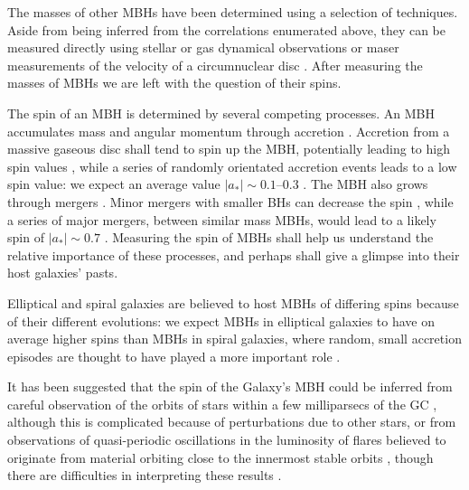 The masses of other MBHs have been determined using a selection of techniques. Aside from being inferred from the correlations enumerated above, they can be measured directly using stellar or gas dynamical observations \citep[e.g.,][]{Macchetto1997,vanderMarel1998,Gebhardt2003} or maser measurements of the velocity of a circumnuclear disc \citep[e.g.,][]{Miyoshi1995}. After measuring the masses of MBHs we are left with the question of their spins.

The spin of an MBH is determined by several competing processes. An MBH accumulates mass and angular momentum through accretion \citep{Volonteri2010,King2013}. Accretion from a massive gaseous disc shall tend to spin up the MBH, potentially leading to high spin values \citep{Volonteri2005}, while a series of randomly orientated accretion events leads to a low spin value: we expect an average value $|a_\ast| \sim 0.1$--$0.3$ \citep{King2006, King2008}. The MBH also grows through mergers \citep{Yu2002, Malbon2007}. Minor mergers with smaller BHs can decrease the spin \citep{Hughes2003, Gammie2004}, while a series of major mergers, between similar mass MBHs, would lead to a likely spin of $|a_\ast| \sim 0.7$ \citep{Gonzalez2007, Berti2007, Berti2008}. Measuring the spin of MBHs shall help us understand the relative importance of these processes, and perhaps shall give a glimpse into their host galaxies' pasts.

Elliptical and spiral galaxies are believed to host MBHs of differing spins because of their different evolutions: we expect MBHs in elliptical galaxies to have on average higher spins than MBHs in spiral galaxies, where random, small accretion episodes are thought to have played a more important role \citep{Volonteri2007, Sikora2007}.

It has been suggested that the spin of the Galaxy's MBH could be inferred from careful observation of the orbits of stars within a few milliparsecs of the GC \citep{Merritt2010}, although this is complicated because of perturbations due to other stars, or from observations of quasi-periodic oscillations in the luminosity of flares believed to originate from material orbiting close to the innermost stable orbits \citep{Genzel2003a, Belanger2006, Trippe2007, Hamaus2009, Kato2010}, though there are difficulties in interpreting these results \citep{Psaltis2008a}.


